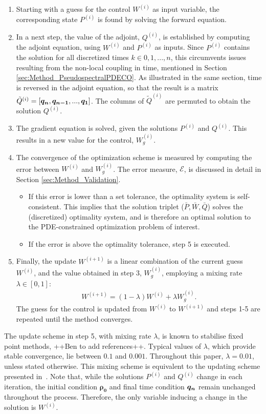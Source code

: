 \begin{enumerate}
	\item Starting with a guess for the control $W^{(i)}$ as input variable, the corresponding state $P^{(i)}$ is found by solving the forward equation.
	\item In a next step, the value of the adjoint, $Q^{(i)}$, is established by computing the adjoint equation, using $W^{(i)}$ and $P^{(i)}$ as inputs. Since $P^{(i)}$ contains the solution for all discretized times $k \in 0,1,...,n$, this circumvents issues resulting from the non-local coupling in time, mentioned in Section \ref{sec:Method_PseudospectralPDECO}. As illustrated in the same section, time is reversed in the adjoint equation, so that the result is a matrix $\tilde{Q}^{(i)} =  [\boldsymbol{q_n},\boldsymbol{q_{n-1}}, ..., \boldsymbol{q_1} ]$. The columns of $\tilde{Q}^{(i)}$ are permuted to obtain the solution  $Q^{(i)}$.
	\item The gradient equation is solved, given the solutions $P^{(i)}$ and $Q^{(i)}$. This results in a new value for the control, $W^{(i)}_g$.
	\item  The convergence of the optimization scheme is measured by computing the error between $W^{(i)}$ and $W^{(i)}_{g}$. The error measure, $\mathcal{E}$, is discussed in detail in Section \ref{sec:Method_Validation}. 
	\begin{itemize}
		\item  If this error is lower than a set tolerance, the optimality system is self-consistent. This implies that the solution triplet ($\bar{P},\bar{W},\bar{Q}$) solves the (discretized) optimality system, and is therefore an optimal solution to the PDE-constrained optimization problem of interest.
		\item If the error is above the optimality tolerance, step 5 is executed.
	\end{itemize}
	\item Finally, the update $W^{(i+1)}$ is a linear combination of the current guess $W^{(i)}$, and the value obtained in step 3, $W^{(i)}_{g}$, employing a mixing rate $\lambda \in [0,1]$:
	\begin{align*}
	W^{(i+1)} = (1-\lambda)W^{(i)} + \lambda W^{(i)}_{g}.
	\end{align*}
	The guess for the control is updated from $W^{(i)} $ to $W^{(i+1)} $ and steps 1-5 are repeated until the method converges. 
\end{enumerate}
\vspace{0.3cm}
The update scheme in step 5, with mixing rate $\lambda$, is known to stabilise fixed point methods, ++Ben to add references++. Typical values of $\lambda$, which provide stable convergence, lie between $0.1$ and $0.001$. Throughout this paper, $\lambda =0.01$, unless stated otherwise. This mixing scheme is equivalent to the updating scheme presented in~\cite{Burger1}. 
Note that, while the solutions $P^{(i)}$ and $Q^{(i)}$ change in each iteration, the initial condition $\boldsymbol{\rho_0}$ and final time condition $\boldsymbol{q_n}$ remain unchanged throughout the process. Therefore, the only variable inducing a change in the solution is $W^{(i)}$.




